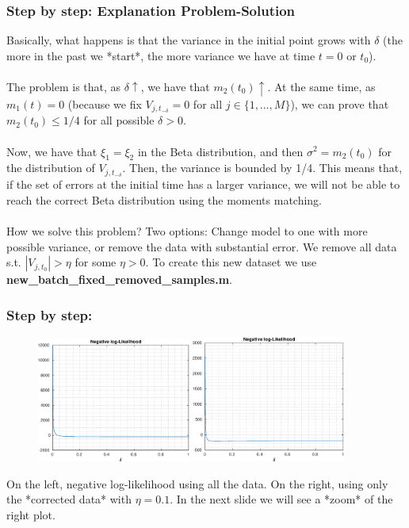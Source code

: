 \documentclass[aspectratio=169]{beamer}\usepackage[utf8]{inputenc}
\begin{document}
\begin{frame}\frametitle{Step by step: Explanation Problem-Solution}

Basically, what happens is that the variance in the initial point grows with $\delta$ (the more in the past we *start*, the more variance we have at time $t=0$ or $t_0$).\\
\quad\\
The problem is that, as $\delta\uparrow$, we have that $m_2(t_0)\uparrow$. At the same time, as $m_1(t)=0$ (because we fix $V_{j,t_{-\delta}}=0$ for all $j\in\{1,\dots,M\}$), we can prove that $m_2(t_0)\leq1/4$ for all possible $\delta>0$.\\
\quad\\
Now, we have that $\xi_1=\xi_2$ in the Beta distribution, and then $\sigma^2=m_2(t_0)$ for the distribution of $V_{j,t_{-\delta}}$. Then, the variance is bounded by 1/4. This means that, if the set of errors at the initial time has a larger variance, we will not be able to reach the correct Beta distribution using the moments matching.\\
\quad\\
How we solve this problem? Two options: Change model to one with more possible variance, or remove the data with substantial error. {\color{orange}We remove all data s.t. $|V_{j,t_0}|>\eta$ for some $\eta>0$.} To create this new dataset we use \textbf{new\_batch\_fixed\_removed\_samples.m}.

\end{frame}


\begin{frame}\frametitle{Step by step:}

\begin{figure}[ht!]
\centering
\includegraphics[width=0.45\textwidth]{../../MATLAB_Files/Results/delta/LL_0.eps}
\includegraphics[width=0.45\textwidth]{../../MATLAB_Files/Results/delta/LL_1.eps}
\end{figure}
On the left, negative log-likelihood using all the data. On the right, using only the {\color{orange}*corrected data* with $\eta=0.1$}. In the next slide we will see a *zoom* of the right plot.
\end{frame}
\end{document}

